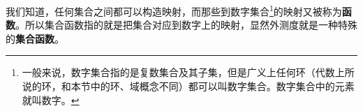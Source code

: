

我们知道，任何集合之间都可以构造映射，而那些到数字集合\footnote{一般来说，数字集合指的是复数集合及其子集，但是广义上任何环（代数上所说的环，和本节中的环、域概念不同）都可以叫数字集合。数字集合中的元素就叫数字。}的映射又被称为\textbf{函数}。所以集合函数指的就是把集合对应到数字上的映射，显然外测度就是一种特殊的\textbf{集合函数}。





















